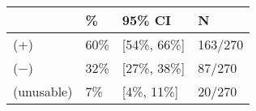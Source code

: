 \begin{tabular}{llll}
\hline
& \% & 95\% CI  & N \\
\hline
(+) & 60\% & [54\%, 66\%] & 163/270\\
($-$) & 32\% & [27\%, 38\%] & 87/270\\
(unusable) & 7\% & [4\%, 11\%] & 20/270\\
\hline
\end{tabular}
